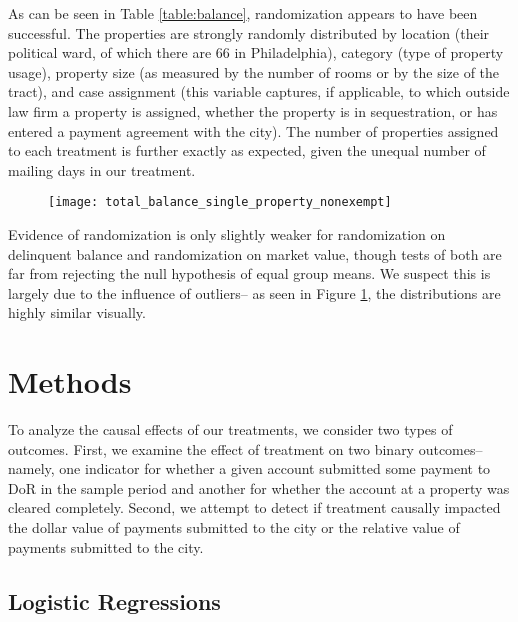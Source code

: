 \documentclass[12pt,titlepage]{article}
\begin{document}
As can be seen in Table \ref{table:balance}, randomization appears to
have been successful.  The properties are strongly randomly
distributed by location (their political ward, of which there are 66
in Philadelphia), category (type of property usage), property size (as
measured by the number of rooms or by the size of the tract), and case
assignment (this variable captures, if applicable, to which outside
law firm a property is assigned, whether the property is in
sequestration, or has entered a payment agreement with the city). The
number of properties assigned to each treatment is further exactly as
expected, given the unequal number of mailing days in our treatment.

\begin{figure}
\caption{}\label{fig:balance_balance}
\begin{center}
\texttt{[image: total\_balance\_single\_property\_nonexempt]}
\par\end{center}
\end{figure}

Evidence of randomization is only slightly weaker for randomization on
delinquent balance and randomization on market value, though tests of
both are far from rejecting the null hypothesis of equal group
means. We suspect this is largely due to the influence of outliers--
as seen in Figure \ref{fig:balance_balance}, the distributions are
highly similar visually.


\section{Methods}

To analyze the causal effects of our treatments, we consider two types of outcomes.
First, we examine the
effect of treatment on two binary outcomes--namely, one indicator for
whether a given account submitted some payment to DoR in the sample
period and another for whether the account at a property was cleared
completely. Second, we attempt to detect if treatment causally
impacted the dollar value of payments submitted to the city or the
relative value of payments submitted to the city.  

\subsection{Logistic Regressions }
\end{document}
